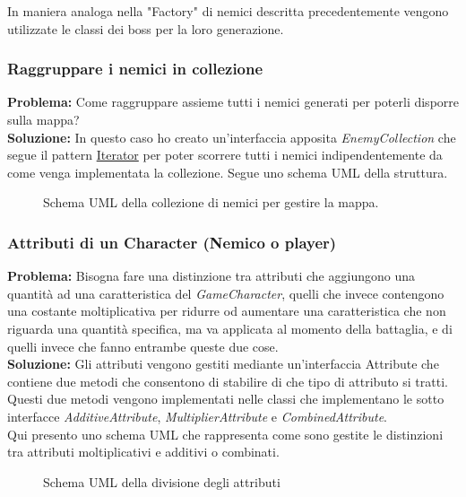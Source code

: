 \documentclass[a4paper,12pt]{report}
\begin{document}
In maniera analoga nella "Factory" di nemici descritta precedentemente vengono utilizzate le classi dei boss per la loro generazione.

\subsubsection{Raggruppare i nemici in collezione}
\textbf{Problema:} Come raggruppare assieme tutti i nemici generati per poterli disporre sulla mappa?\\
\textbf{Soluzione:} In questo caso ho creato un'interfaccia apposita \textit{EnemyCollection} che segue il pattern \href{https://refactoring.guru/design-patterns/iterator}{Iterator} per poter scorrere tutti i nemici indipendentemente da come venga implementata la collezione. Segue uno schema UML della struttura.\\

\begin{figure}[H]
	\centering
	
	\caption{Schema UML della collezione di nemici per gestire la mappa.}
	\label{fig:Schema UML della collezione di nemici per gestire la mappa.}
\end{figure}

\subsubsection{Attributi di un Character (Nemico o player)}
\textbf{Problema:} Bisogna fare una distinzione tra attributi che aggiungono una quantità ad una caratteristica del \textit{GameCharacter}, quelli che invece contengono una costante moltiplicativa per ridurre od aumentare una caratteristica che non riguarda una quantità specifica, ma va applicata al momento della battaglia, e di quelli invece che fanno entrambe queste due cose.\\
\textbf{Soluzione:} Gli attributi vengono gestiti mediante un'interfaccia Attribute che contiene due metodi che consentono di stabilire di che tipo di attributo si tratti. Questi due metodi vengono implementati nelle classi che implementano le sotto interfacce \textit{AdditiveAttribute}, \textit{MultiplierAttribute} e \textit{CombinedAttribute}.\\
Qui presento uno schema UML che rappresenta come sono gestite le distinzioni tra attributi moltiplicativi e additivi o combinati.\\

\begin{figure}[H]
	\centering
	
	\caption{Schema UML della divisione degli attributi}
	\label{fig:Schema UML della divisione degli attributi}
\end{figure}
\end{document}
